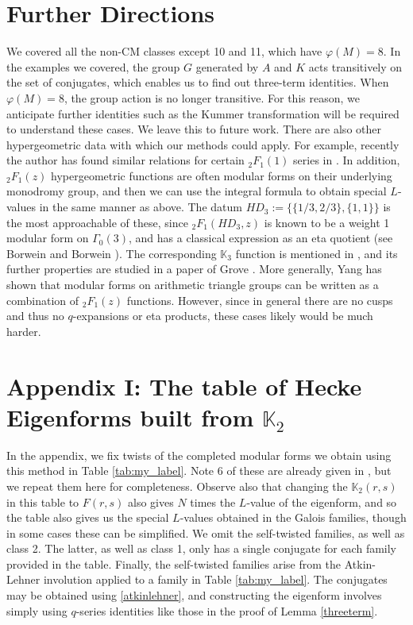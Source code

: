 \documentclass[12pt]{amsart}
\theoremstyle{definition}
\theoremstyle{remark}
\begin{document}
\section{Further Directions}
We covered all the non-CM classes except 10 and 11, which have $\varphi(M)=8$. In the examples we covered, the group $G$ generated by $A$ and $K$ acts transitively on the set of conjugates, which enables us to find out three-term identities. When $\varphi(M)=8$, the group action is no longer transitive. For this reason, we anticipate further identities such as the Kummer transformation will be required to understand these cases. We leave this to future work. There are also other hypergeometric data with which our methods could apply. For example, recently the author has found similar relations for certain ${}_2F_1(1)$ series in \cite{rosen}. In addition,  ${}_2F_1(z)$ hypergeometric functions are often modular forms on their underlying monodromy group, and then we can use the integral formula to obtain special $L$-values in the same manner as above. The datum $HD_3:=\{\{1/3,2/3\},\{1,1\}\}$ is the most approachable of these, since  ${}_2F_1(HD_3,z)$ is known to be a weight 1 modular form on $\Gamma_0(3)$, and has a classical expression as an eta quotient (see Borwein and Borwein \cite{piagm}). The corresponding $\mathbb{K}_3$ function is mentioned in \cite{aglt}, and its further properties are studied in a paper of Grove \cite{grove}. More generally, Yang \cite{yang} has shown that modular forms on arithmetic triangle groups can be written as a combination of  ${}_2F_1(z)$ functions. However, since in general there are no cusps and thus no $q$-expansions or eta products, these cases likely would be much harder. 


\section{Appendix I: The table of Hecke Eigenforms built from $\mathbb{K}_2$} \label{append}
In the appendix, we fix twists of the completed modular forms we obtain using this method in Table \ref{tab:my_label}. Note 6 of these are already given in \cite{aglt}, but we repeat them here for completeness.  Observe also that changing the $\mathbb{K}_2(r,s)$ in this table to $F(r,s)$ also gives $N$ times the $L$-value of the eigenform, and so the table also gives us the special $L$-values obtained in the Galois families, though in some cases these can be simplified. We omit the self-twisted families, as well as class 2. The latter, as well as class 1, only has a single conjugate for each family provided in the table. Finally, the self-twisted families arise from the Atkin-Lehner involution applied to a family in Table \ref{tab:my_label}. The conjugates may be obtained using \eqref{atkinlehner}, and constructing the eigenform involves simply using $q$-series identities like those in the proof of Lemma \ref{threeterm}. 
\end{document}
